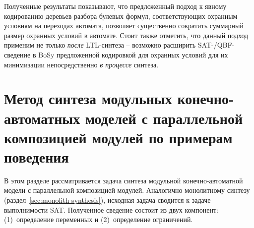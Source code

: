 Полученные результаты показывают, что предложенный подход к явному кодированию деревьев разбора булевых формул, соответствующих охранным условиям на переходах автомата, позволяет существенно сократить суммарный размер охранных условий в автомате.
Стоит также отметить, что данный подход применим не только \emph{после} LTL-синтеза \--- возможно расширить SAT-/QBF-сведение в BoSy предложенной кодировкой для охранных условий для их минимизации непосредственно \emph{в процессе} синтеза.






% 

% 
\section{Метод синтеза модульных конечно-автоматных моделей с параллельной композицией модулей по примерам поведения}%
\label{sec:modular-parallel-synthesis}

В этом разделе рассматривается задача синтеза модульной конечно-автоматной модели с параллельной композицией модулей.
Аналогично монолитному синтезу (раздел~\ref{sec:monolith-synthesis}), исходная задача сводится к задаче выполнимости SAT.
Полученное сведение состоит из двух компонент: (1)~определение переменных и (2)~определение ограничений.


